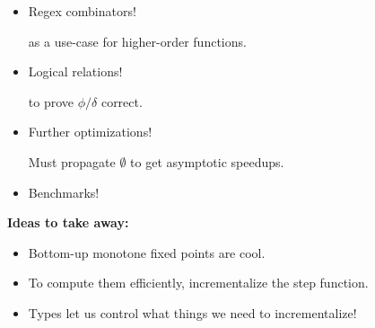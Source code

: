\documentclass[aspectratio=169,dvipsnames]{beamer}
\providecommand\strong[1]{{\bfseries#1}}
\newcommand\naive{na\"ive}
\begin{document}
  \begin{frame}{}{}
    \centering
    \begin{itemize}
    \item Regex combinators!\\
      {\normalsize as a use-case for higher-order functions.\par}

    \item Logical relations!\\
      {\normalsize to prove $\phi/\delta$ correct.\par}

    \item Further optimizations!\\
      {\normalsize Must propagate $\emptyset$ to get asymptotic speedups.\par}

    \item Benchmarks!\\[1ex]
      {\scriptsize
        \par}
    \end{itemize}

  \end{frame}


  \begin{frame}
    \strong{Ideas to take away:}\vspace{1ex}
    \begin{itemize}
    \item Bottom-up monotone fixed points are cool.
    \item To compute them efficiently, incrementalize the step function.
    \item Types let us control what things we need to incrementalize!
    \end{itemize}
    \vspace{\baselineskip}
  \end{frame}
\end{document}
